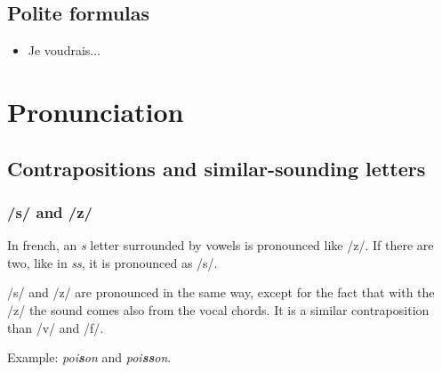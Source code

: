 \documentclass[palatino]{nicenotes}
\begin{document}
\section{Polite formulas}

\begin{itemize}
\item Je voudrais...
\end{itemize}

\chapter{Pronunciation}

\section{Contrapositions and similar-sounding letters}

\subsection{/s/ and /z/}

In french, an \textit{s} letter surrounded by vowels is pronounced like /z/. If there are two, like in \textit{ss}, it is pronounced as /s/.

/s/ and /z/ are pronounced in the same way, except for the fact that with the /z/ the sound comes also from the vocal chords. It is a similar contraposition than /v/ and /f/.

Example: \textit{poi\textbf{s}on} and \textit{poi\textbf{ss}on}.

\backmatter
\printindex
\end{document}
